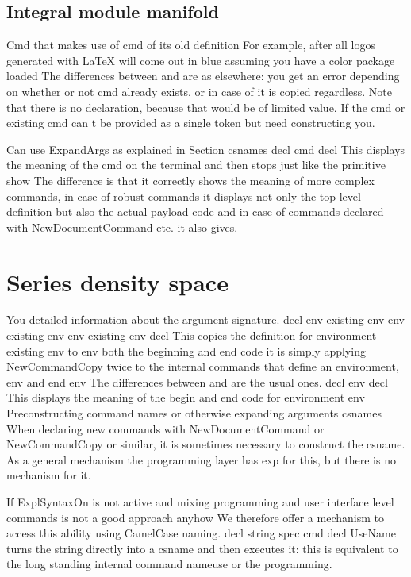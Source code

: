 \documentclass{article}
\begin{document}
\subsection{Integral module manifold}
Cmd that makes use of cmd of its old definition For example, after all logos generated with LaTeX will come out in blue assuming you have a color package loaded The differences between and are as elsewhere: you get an error depending on whether or not cmd already exists, or in case of it is copied regardless. Note that there is no declaration, because that would be of limited value. If the cmd or existing cmd can t be provided as a single token but need constructing you.

Can use ExpandArgs as explained in Section csnames decl cmd decl This displays the meaning of the cmd on the terminal and then stops just like the primitive show The difference is that it correctly shows the meaning of more complex commands, in case of robust commands it displays not only the top level definition but also the actual payload code and in case of commands declared with NewDocumentCommand etc. it also gives.

\section{Series density space}\label{sec12}
You detailed information about the argument signature. decl env existing env env existing env env existing env decl This copies the definition for environment existing env to env both the beginning and end code it is simply applying NewCommandCopy twice to the internal commands that define an environment, env and end env The differences between and are the usual ones. decl env decl This displays the meaning of the begin and end code for environment env Preconstructing command names or otherwise expanding arguments csnames When declaring new commands with NewDocumentCommand or NewCommandCopy or similar, it is sometimes necessary to construct the csname. As a general mechanism the programming layer has exp for this, but there is no mechanism for it.

If ExplSyntaxOn is not active and mixing programming and user interface level commands is not a good approach anyhow We therefore offer a mechanism to access this ability using CamelCase naming. decl string spec cmd decl UseName turns the string directly into a csname and then executes it: this is equivalent to the long standing internal command nameuse or the programming.
\end{document}

